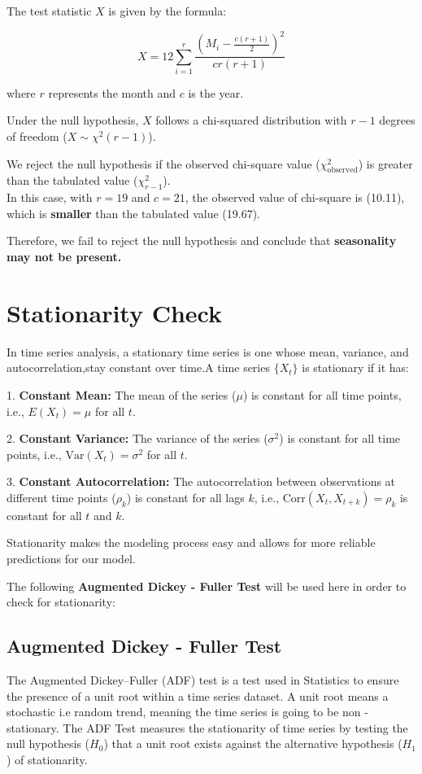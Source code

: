 \documentclass{article}
\begin{document}
The test statistic \(X\) is given by the formula:

\[ X = 12 \sum_{i=1}^{r} \frac{(M_i - \frac{c(r+1)}{2})^2}{cr(r+1)} \]

where \(r\) represents the month and \(c\) is the year.

Under the null hypothesis, \(X\) follows a chi-squared distribution with \(r-1\) degrees of freedom (\(X \sim \chi^2(r-1)\)).

We reject the null hypothesis if the observed chi-square value (\(\chi^2_{\text{observed}}\)) is greater than the tabulated value (\(\chi^2_{r-1}\)). \\
In this case, with \(r = 19\) and \(c= 21\), the observed value of chi-square is (10.11), which is \textbf{smaller} than the tabulated value (19.67). 

Therefore, we fail to reject the null hypothesis and conclude that \textbf{seasonality may not be present.}




\section{Stationarity Check}
In time series analysis, a stationary time series is one whose mean, variance, and autocorrelation,stay constant over time.A time series \(\{X_t\}\) is stationary if it has:

1. \textbf{Constant Mean:} The mean of the series (\(\mu\)) is constant for all time points, i.e., \(E(X_t) = \mu\) for all \(t\).

2. \textbf{Constant Variance:} The variance of the series (\(\sigma^2\)) is constant for all time points, i.e., \(\text{Var}(X_t) = \sigma^2\) for all \(t\).

3. \textbf{Constant Autocorrelation:} The autocorrelation between observations at different time points (\(\rho_k\)) is constant for all lags \(k\), i.e., \(\text{Corr}(X_t, X_{t+k}) = \rho_k\) is constant for all \(t\) and \(k\).

Stationarity makes the modeling process easy and allows for more reliable predictions for our model.

The following \textbf{Augmented Dickey - Fuller Test} will be used here in order to check for stationarity:

\subsection*{Augmented Dickey - Fuller Test}
The Augmented Dickey–Fuller (ADF) test is a test used in Statistics to ensure the presence of a unit root within a time series dataset. A unit root means a stochastic i.e random trend, meaning the time series is going to be non - stationary.
The ADF Test measures the stationarity of time series by testing the null hypothesis (\(H_0\)) that a unit root exists against the alternative hypothesis (\(H_1\)) of stationarity.
\end{document}
